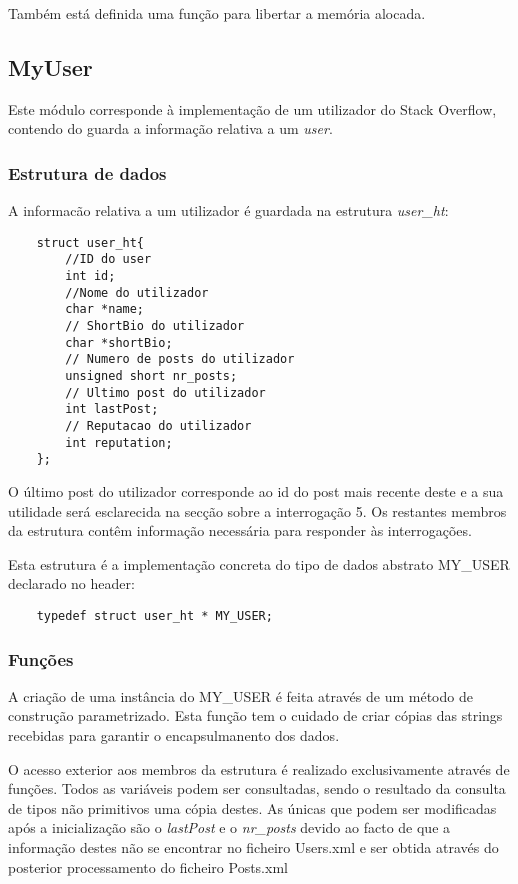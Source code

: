 \documentclass[10pt]{article}
\begin{document}
	Também está definida uma função para libertar a memória alocada.

\subsection{MyUser}
	Este módulo corresponde à implementação de um utilizador do Stack Overflow, contendo do  guarda a informação relativa a um \emph{user}. 
\subsubsection{Estrutura de dados}
	
	A informacão relativa a um utilizador é guardada na estrutura \emph{user\_ht}:
	\begin{lstlisting}
	struct user_ht{
		//ID do user 
		int id;
		//Nome do utilizador 
		char *name;
		// ShortBio do utilizador 
		char *shortBio;
		// Numero de posts do utilizador 
		unsigned short nr_posts;
		// Ultimo post do utilizador 
		int lastPost;
		// Reputacao do utilizador 
		int reputation;
	};
	\end{lstlisting}


	O último post do utilizador corresponde ao id do post mais recente deste e a sua utilidade será esclarecida na secção sobre a interrogação 5. Os restantes membros da estrutura contêm informação necessária para responder às interrogações.

	Esta estrutura é a implementação concreta do tipo de dados abstrato MY\_USER declarado no header:
	\begin{lstlisting} 
	typedef struct user_ht * MY_USER;
	\end{lstlisting}

\subsubsection{Funções}

	A criação de uma instância do MY\_USER é feita através de um método de construção parametrizado. Esta função tem o cuidado de criar cópias das strings recebidas para garantir o encapsulmanento dos dados.

	O acesso exterior aos membros da estrutura é realizado exclusivamente através de funções. Todos as variáveis podem ser consultadas, sendo o resultado da consulta de tipos não primitivos uma cópia destes. As únicas que podem ser modificadas após a inicialização são o \emph{lastPost} e o \emph{nr\_posts} devido ao facto de que a informação destes não se encontrar no ficheiro Users.xml e ser obtida através do posterior processamento do ficheiro Posts.xml
\end{document}
